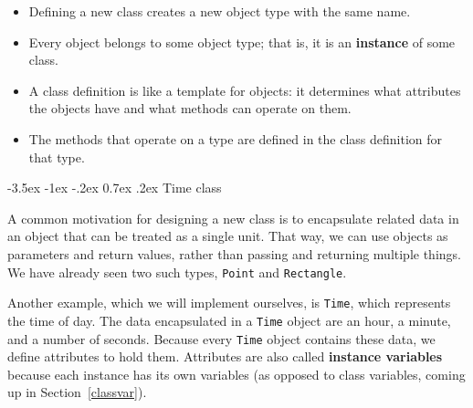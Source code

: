 \documentclass[12pt]{book}
\makeatletter
\theoremstyle{exercise}
\newcommand{\java}[1]{\verb"#1"}
\renewcommand{\section}{\@startsection{section}{1}{\z@}%
    {-3.5ex \@plus -1ex \@minus -.2ex}%
    {0.7ex \@plus.2ex}%
    {\normalfont\Large\bfseries}}
\newcommand{\java}[1]{\lstinline{#1}} %
\makeatother
\begin{document}
\begin{itemize}

\item Defining a new class creates a new object type with the same name.


\item Every object belongs to some object type; that is, it is an {\bf instance} of some class.

\item A class definition is like a template for objects: it determines what attributes the objects have and what methods can operate on them.

\item The methods that operate on a type are defined in the class definition for that type.



\end{itemize}


\section{Time class}


A common motivation for designing a new class is to encapsulate related data in an object that can be treated as a single unit.
That way, we can use objects as parameters and return values, rather than passing and returning multiple things.
We have already seen two such types, \java{Point} and \java{Rectangle}.


Another example, which we will implement ourselves, is \java{Time}, which represents the time of day.
The data encapsulated in a \java{Time} object are an hour, a minute, and a number of seconds.
Because every \java{Time} object contains these data, we define attributes to hold them.
Attributes are also called {\bf instance variables} because each instance has its own variables (as opposed to class variables, coming up in Section~\ref{classvar}).
\end{document}
